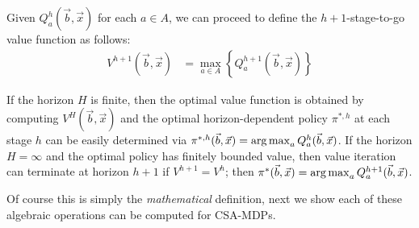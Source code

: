 Given $Q_a^h(\vec{b},\vec{x})$ for each $a \in A$, we can proceed
to define the $h+1$-stage-to-go value function as follows:
\begin{align}
V^{h+1}(\vec{b},\vec{x}) & = \max_{a \in A} \left\{ Q^{h+1}_a(\vec{b},\vec{x}) \right\} \label{eq:vfun}
\end{align}

If the horizon $H$ is finite, then the optimal value function is
obtained by computing $V^H(\vec{b},\vec{x})$ and the optimal
horizon-dependent policy $\pi^{*,h}$ at each stage $h$ can be easily
determined via 
$\pi^{*,h}(\vec{b},\vec{x}) = \argmax_a Q^h_a(\vec{b},\vec{x})$.  
If the horizon 
$H = \infty$ and the optimal policy has finitely bounded value, 
then value iteration can terminate at horizon $h+1$ if 
$V^{h+1} = V^{h}$; then 
$\pi^*(\vec{b},\vec{x}) = \argmax_a Q^{h+1}_a(\vec{b},\vec{x})$.

Of course this is simply the \emph{mathematical} definition, next
we show each of these algebraic operations can be computed for
CSA-MDPs.

